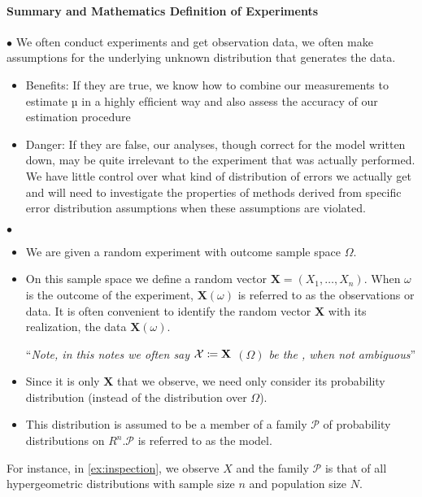 \documentclass{article}
\begin{document}
\paragraph{Summary and Mathematics Definition of Experiments}
$\bullet$ 
We often conduct experiments and get observation data, we often make assumptions for the underlying unknown distribution that generates the data.  
\begin{itemize}
    \item Benefits: If they are true, we know how to combine our measurements to estimate µ in a highly efﬁcient way and also assess the accuracy of our estimation procedure
    \item Danger: If they are false, our analyses, though correct for the model written down, may be quite irrelevant to the experiment that was actually performed. We have little control over what kind of distribution of errors we actually get and will need to investigate the properties of methods derived from specific error distribution assumptions when these assumptions are violated.
\end{itemize}

$\bullet$ 
\begin{itemize}
    \item {} We are given a random experiment with  outcome sample space $\Omega$.
    \item  {} On this sample space we define a random vector $\mathbf{X}=\left(X_{1}, \ldots, X_{n}\right) .$ When $\omega$ is the outcome of the experiment, $\mathbf{X}(\omega)$ is referred to as the observations or data. It is often convenient to identify the random vector $\mathbf{X}$ with its realization, the data $\mathbf{X}(\omega)$.  
    
    ``\emph{Note, in this notes we often say $\cal{X}\coloneqq \mathbf{X}$ $(\Omega)$ be the , when not ambiguous}''
    
    \item  {} Since it is only $\mathbf{X}$ that we observe, we need only consider its probability distribution (instead of the distribution over $\Omega$). 
    \item {} This distribution is assumed to be a member of a family $\mathcal{P}$ of probability distributions on $R^{n} . \mathcal{P}$ is referred to as the model.
\end{itemize}
\begin{exma}
 For instance, in \cref{ex:inspection}, we observe $X$ and the family $\mathcal{P}$ is that of all hypergeometric distributions with sample size $n$ and population size $N$.
\end{exma}
\end{document}
